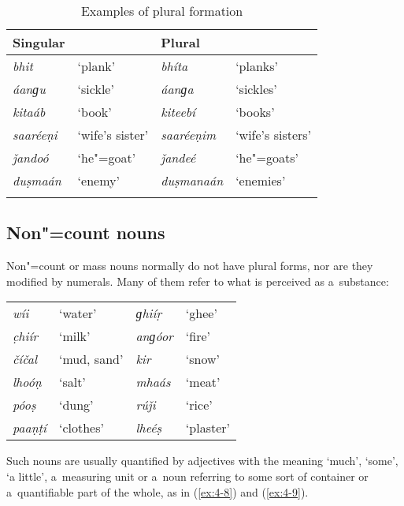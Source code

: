 \begin{table}[ht]
\caption{Examples of plural formation}
\begin{tabularx}{\textwidth}{ Q Q Q Q }
\lsptoprule
Singular &
&
Plural &
\\\hline
\textit{bhit} &
`plank' &
\textit{bhíta} &
`planks'\\
\textit{áanɡu} &
`sickle' &
\textit{áanɡa} &
`sickles'\\
\textit{kitaáb} &
`book' &
\textit{kiteebí} &
`books'\\
\textit{saaréeṇi} &
`wife's sister' &
\textit{saaréeṇim} &
`wife's sisters'\\
\textit{ǰandoó} &
`he"=goat' &
\textit{ǰandeé} &
`he"=goats'\\
\textit{duṣmaán} &
`enemy' &
\textit{duṣmanaán} &
`enemies'\\\lspbottomrule
\end{tabularx}
\label{tab:4-5}
\end{table}

\subsection{Non"=count nouns}
\label{subsec:4-4-1}


Non"=count or mass nouns normally do not have plural forms, nor are they modified by numerals. Many of them refer to what is perceived as a~substance:



\begin{table}[H]
\begin{tabularx}{\textwidth}{ Q Q Q Q }
\textit{wíi} &
`water' &
\textit{ɡhiíṛ} &
`ghee'\\
\textit{c̣hiír} &
`milk' &
\textit{anɡóor} &
`fire'\\
\textit{číčal} &
`mud, sand' &
\textit{kir} &
`snow'\\
\textit{lhoóṇ} &
`salt' &
\textit{mhaás} &
`meat'\\
\textit{póoṣ} &
`dung' &
\textit{rúǰi} &
`rice'\\
\textit{paaṇṭí} &
`clothes' &
\textit{lheéṣ} &
`plaster'\\
\end{tabularx}
\end{table}

Such nouns are usually quantified by adjectives with the meaning `much', `some', `a little', a~measuring unit or a~noun referring to some sort of container or a~quantifiable part of the whole, as in (\ref{ex:4-8}) and (\ref{ex:4-9}). 

